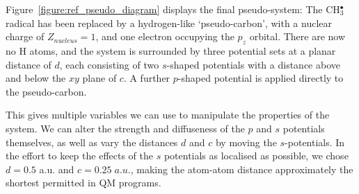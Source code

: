 \documentclass[12pt]{article}
\begin{document}
Figure~\ref{figure:ref_pseudo_diagram} displays the final pseudo-system: The CH\(^{\bullet}_{3}\) radical has been replaced by a hydrogen-like `pseudo-carbon', with a nuclear charge of \(Z_{nucleus} = 1\), and one electron occupying the \(p_{z}\) orbital. 
There are now no H atoms, and the system is surrounded by three potential sets at a planar distance of \(d\), each consisting of 
two \(s\)-shaped potentials with a distance above and below the \(xy\) plane of \(c\). A further \(p\)-shaped potential is applied
directly to the pseudo-carbon.

This gives multiple variables we can use to manipulate the properties of the system.
We can alter the strength and diffuseness of the \(p\) and \(s\) potentials themselves,
as well as vary the distances \(d\) and \(c\) by moving the \(s\)-potentials.
In the effort to keep the effects 
of the $s$ potentials as localised as possible, we chose $d=0.5$ a.u. and \(c = 0.25\;a.u.\), making the atom-atom distance approximately the shortest permitted in QM programs.
\end{document}

